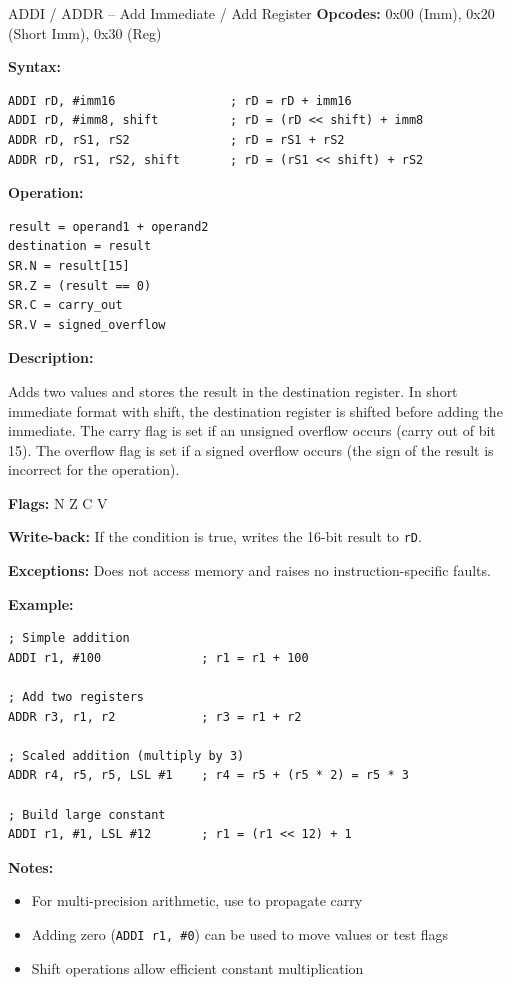 \begin{instructionbox}{ADDI / ADDR -- Add Immediate / Add Register}
	\textbf{Opcodes:} 0x00 (Imm), 0x20 (Short Imm), 0x30 (Reg)

	\textbf{Syntax:}
	\begin{lstlisting}
ADDI rD, #imm16                ; rD = rD + imm16
ADDI rD, #imm8, shift          ; rD = (rD << shift) + imm8
ADDR rD, rS1, rS2              ; rD = rS1 + rS2
ADDR rD, rS1, rS2, shift       ; rD = (rS1 << shift) + rS2
\end{lstlisting}

	\textbf{Operation:}
	\begin{verbatim}
result = operand1 + operand2
destination = result
SR.N = result[15]
SR.Z = (result == 0)
SR.C = carry_out
SR.V = signed_overflow
\end{verbatim}

	\textbf{Description:}

	Adds two values and stores the result in the destination register. In short immediate format with shift, the
	destination register is shifted before adding the immediate. The carry flag is set if an unsigned overflow occurs
	(carry out of bit 15). The overflow flag is set if a signed overflow occurs (the sign of the result is incorrect for
	the operation).

	\textbf{Flags:} N Z C V

	\textbf{Write-back:} If the condition is true, writes the 16-bit result to \texttt{rD}.

	\textbf{Exceptions:} Does not access memory and raises no instruction-specific faults.

	\textbf{Example:}
	\begin{lstlisting}
; Simple addition
ADDI r1, #100              ; r1 = r1 + 100

; Add two registers
ADDR r3, r1, r2            ; r3 = r1 + r2

; Scaled addition (multiply by 3)
ADDR r4, r5, r5, LSL #1    ; r4 = r5 + (r5 * 2) = r5 * 3

; Build large constant
ADDI r1, #1, LSL #12       ; r1 = (r1 << 12) + 1
\end{lstlisting}

	\textbf{Notes:}
	\begin{itemize}
		\item For multi-precision arithmetic, use  to propagate carry
		\item Adding zero (\texttt{ADDI r1, \#0}) can be used to move values or test flags
		\item Shift operations allow efficient constant multiplication
	\end{itemize}
\end{instructionbox}

